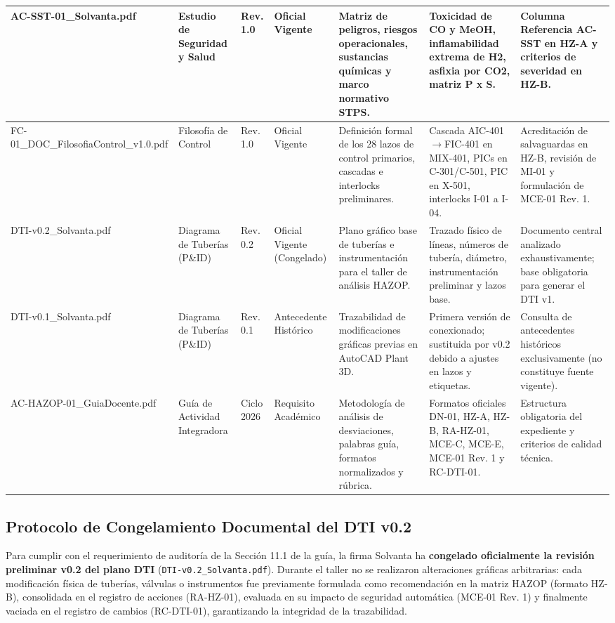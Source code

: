 \documentclass[10pt,letterpaper]{article}
\begin{document}
\begin{table}[H]
\begin{tabularx}{\textwidth}{|p{2.6cm}|p{2.0cm}|p{1.4cm}|p{1.8cm}|X|X|p{2.2cm}|}
AC-SST-01\_Solvanta.pdf & Estudio de Seguridad y Salud & Rev. 1.0 & Oficial Vigente & Matriz de peligros, riesgos operacionales, sustancias químicas y marco normativo STPS. & Toxicidad de CO y MeOH, inflamabilidad extrema de H2, asfixia por CO2, matriz P x S. & Columna Referencia AC-SST en HZ-A y criterios de severidad en HZ-B. \\ \hline
FC-01\_DOC\_FilosofiaControl\_v1.0.pdf & Filosofía de Control & Rev. 1.0 & Oficial Vigente & Definición formal de los 28 lazos de control primarios, cascadas e interlocks preliminares. & Cascada AIC-401$\to$FIC-401 en MIX-401, PICs en C-301/C-501, PIC en X-501, interlocks I-01 a I-04. & Acreditación de salvaguardas en HZ-B, revisión de MI-01 y formulación de MCE-01 Rev. 1. \\ \hline
DTI-v0.2\_Solvanta.pdf & Diagrama de Tuberías (P\&ID) & Rev. 0.2 & Oficial Vigente (Congelado) & Plano gráfico base de tuberías e instrumentación para el taller de análisis HAZOP. & Trazado físico de líneas, números de tubería, diámetro, instrumentación preliminar y lazos base. & Documento central analizado exhaustivamente; base obligatoria para generar el DTI v1. \\ \hline
DTI-v0.1\_Solvanta.pdf & Diagrama de Tuberías (P\&ID) & Rev. 0.1 & Antecedente Histórico & Trazabilidad de modificaciones gráficas previas en AutoCAD Plant 3D. & Primera versión de conexionado; sustituida por v0.2 debido a ajustes en lazos y etiquetas. & Consulta de antecedentes históricos exclusivamente (no constituye fuente vigente). \\ \hline
AC-HAZOP-01\_GuiaDocente.pdf & Guía de Actividad Integradora & Ciclo 2026 & Requisito Académico & Metodología de análisis de desviaciones, palabras guía, formatos normalizados y rúbrica. & Formatos oficiales DN-01, HZ-A, HZ-B, RA-HZ-01, MCE-C, MCE-E, MCE-01 Rev. 1 y RC-DTI-01. & Estructura obligatoria del expediente y criterios de calidad técnica. \\ \hline
\end{tabularx}
\end{table}

\subsection{Protocolo de Congelamiento Documental del DTI v0.2}
Para cumplir con el requerimiento de auditoría de la Sección 11.1 de la guía, la firma Solvanta ha \textbf{congelado oficialmente la revisión preliminar v0.2 del plano DTI} (\texttt{DTI-v0.2\_Solvanta.pdf}). Durante el taller no se realizaron alteraciones gráficas arbitrarias: cada modificación física de tuberías, válvulas o instrumentos fue previamente formulada como recomendación en la matriz HAZOP (formato HZ-B), consolidada en el registro de acciones (RA-HZ-01), evaluada en su impacto de seguridad automática (MCE-01 Rev. 1) y finalmente vaciada en el registro de cambios (RC-DTI-01), garantizando la integridad de la trazabilidad.
\newpage
\end{document}
